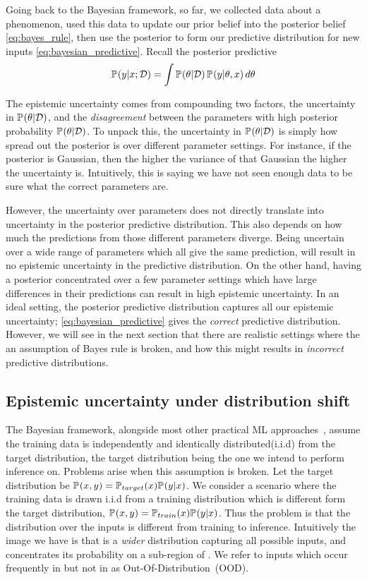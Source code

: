 Going back to the Bayesian framework, so far, we collected data about a phenomenon, used this data to update our prior belief into the posterior belief \cref{eq:bayes_rule}, then use the posterior to form our predictive distribution for new inputs \cref{eq:bayesian_predictive}.
Recall the posterior predictive
$$
    \pdf{y|x; \mathcal{D}}=  \int \pdf{\theta | \mathcal{D}}\, \pdf{y|\theta, x} \, d\theta
$$


The epistemic uncertainty comes from compounding two factors, the uncertainty in $\pdf{\theta | \mathcal{D}}$, and the \emph{disagreement} between the parameters with high posterior probability  $\pdf{\theta | \mathcal{D}}$. 
To unpack this, the uncertainty in $\pdf{\theta | \mathcal{D}}$ is simply how spread out the posterior is over different parameter settings. For instance, if the posterior is Gaussian, then the higher the variance of that Gaussian the higher the uncertainty is. Intuitively, this is saying we have not seen enough data to be sure what the correct parameters are.

However, the uncertainty over parameters does not directly translate into uncertainty in the posterior predictive distribution. This also depends on how much the predictions from those different parameters diverge. Being uncertain over a wide range of parameters which all give the same prediction, will result in no epistemic uncertainty in the predictive distribution. On the other hand, having a posterior concentrated over a few parameter settings which have large differences in their predictions can result in high epistemic uncertainty. In an ideal setting, the posterior predictive distribution captures all our epistemic uncertainty; \cref{eq:bayesian_predictive} gives the \emph{correct} predictive distribution. However, we will see in the next section that there are realistic settings where the an assumption of Bayes rule is broken, and how this might results in \emph{incorrect} predictive distributions. 


\subsection{Epistemic uncertainty under distribution shift}
\label{sec:epistemic_shift}

The Bayesian framework, alongside most other practical ML approaches~\citep[chapter~5]{goodfellow2016deep}, assume the training data is independently and identically distributed(i.i.d) from the target distribution, the target distribution being the one we intend to perform inference on. Problems arise when this assumption is broken.
Let the target distribution be $\pdf{x,y} = \pdf[target]{x} \pdf{y|x}$.
We consider a scenario where the training data is drawn i.i.d from a training distribution which is different form the target distribution, $\pdf{x,y} = \pdf[train]{x} \pdf{y|x}$. Thus the problem is that the distribution over the inputs is different from training to inference. 
Intuitively the image we have is that  is a \emph{wider} distribution capturing all possible inputs, and  concentrates its probability on a sub-region of . We refer to inputs which occur frequently in  but not in  as Out-Of-Distribution~(OOD).

